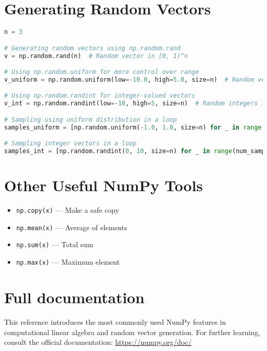 \documentclass{article}
\begin{document}
\section{Generating Random Vectors}
\begin{lstlisting}[language=Python]
n = 3

# Generating random vectors using np.random.rand
v = np.random.rand(n)  # Random vector in [0, 1)^n

# Using np.random.uniform for more control over range
v_uniform = np.random.uniform(low=-10.0, high=5.0, size=n)  # Random vector in [-10, 5)

# Using np.random.randint for integer-valued vectors
v_int = np.random.randint(low=-10, high=5, size=n)  # Random integers in [-10, 5)

# Sampling using uniform distribution in a loop
samples_uniform = [np.random.uniform(-1.0, 1.0, size=n) for _ in range(num_samples)]

# Sampling integer vectors in a loop
samples_int = [np.random.randint(0, 10, size=n) for _ in range(num_samples)]
\end{lstlisting}



\section{Other Useful NumPy Tools}
\begin{itemize}
  \item \texttt{np.copy(x)} — Make a safe copy
  \item \texttt{np.mean(x)} — Average of elements
  \item \texttt{np.sum(x)} — Total sum
  \item \texttt{np.max(x)} — Maximum element
\end{itemize}

\section{Full documentation}
This reference introduces the most commonly used NumPy features in computational linear algebra and random vector generation. For further learning, consult the official documentation: \url{https://numpy.org/doc/}
\end{document}
